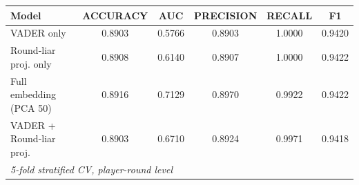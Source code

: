 \begingroup
\centering
\begin{tabular}{lccccc}
   \tabularnewline \midrule \midrule
   Model & ACCURACY & AUC & PRECISION & RECALL & F1 \\
   \midrule
   VADER only & 0.8903 & 0.5766 & 0.8903 & 1.0000 & 0.9420 \\
   Round-liar proj. only & 0.8908 & 0.6140 & 0.8907 & 1.0000 & 0.9422 \\
   Full embedding (PCA 50) & 0.8916 & 0.7129 & 0.8970 & 0.9922 & 0.9422 \\
   VADER + Round-liar proj. & 0.8903 & 0.6710 & 0.8924 & 0.9971 & 0.9418 \\
   \midrule \midrule
   \multicolumn{6}{l}{\emph{5-fold stratified CV, player-round level}}\\
\end{tabular}
\par\endgroup
